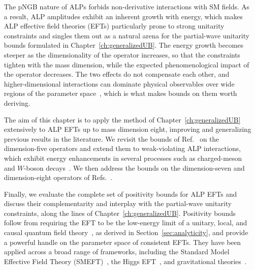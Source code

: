 The pNGB nature of ALPs forbids non-derivative interactions with SM fields. As a result, ALP
amplitudes exhibit an inherent growth with energy, which makes ALP effective field theories (EFTs) particularly prone to strong
unitarity constraints and singles them out as a natural arena for the partial-wave unitarity bounds
formulated in Chapter~\ref{ch:generalizedUB}. The energy growth becomes steeper as the dimensionality
of the operator increases, so that the constraints tighten with the mass dimension, while the
expected phenomenological impact of the operator decreases. The two effects do not compensate each
other, and higher-dimensional interactions can dominate physical observables over wide regions of the
parameter space~\cite{Bertuzzo:2023slg}, which is what makes bounds on them worth deriving.

The aim of this chapter is to apply the method of Chapter~\ref{ch:generalizedUB} extensively to ALP
EFTs up to mass dimension eight, improving and generalizing previous results in the literature. We
revisit the bounds of Ref.~\cite{Brivio:2021fog} on the dimension-five operators and extend them to
weak-violating ALP interactions, which exhibit energy enhancements in several processes such as
charged-meson and $W$-boson decays~\cite{Altmannshofer:2022ckw}. We then address the bounds on the
dimension-seven and dimension-eight operators of
Refs.~\cite{Song:2023lxf,Grojean:2023tsd,Bertuzzo:2023slg}.

Finally, we evaluate the complete set of positivity bounds for ALP EFTs and discuss their
complementarity and interplay with the partial-wave unitarity constraints, along the lines of
Chapter~\ref{ch:generalizedUB}. Positivity bounds follow from requiring the EFT to be the low-energy
limit of a unitary, local, and causal quantum field theory~\cite{Adams:2006sv}, as derived in
Section~\ref{sec:analyticity}, and provide a powerful handle on the parameter space of consistent
EFTs. They have been applied across a broad range of frameworks, including the
Standard Model Effective Field Theory (SMEFT)~\cite{Bellazzini:2018paj,Zhang:2020jyn,Bonnefoy:2025uzf,Bi:2019phv,Remmen:2019cyz,%
Remmen:2020vts,Fuks:2020ujk,Yamashita:2020gtt,Gu:2020ldn,Bonnefoy:2020yee,Henriksson:2021ymi,%
Zhang:2021eeo,Chala:2021wpj,Chala:2023jyx,Chala:2023xjy,Li:2022rag,Ghosh:2022qqq,Li:2022aby,%
Gu:2023emi,Chen:2023bhu,Ye:2024rzr,Ye:2025zhs,Davighi:2023acq}, the Higgs
EFT~\cite{Remmen:2024hry,Chakraborty:2024ciu}, and gravitational
theories~\cite{Cheung:2016yqr,Bellazzini:2017fep,deRham:2017xox,Alberte:2020jsk,Hong:2023zgm,%
Alviani:2024sxx,Tokuda:2020mlf,Alberte:2020bdz,Chiang:2022jep,deRham:2022gfe,Caron-Huot:2021rmr,%
Alberte:2021dnj,Caron-Huot:2022ugt}.

